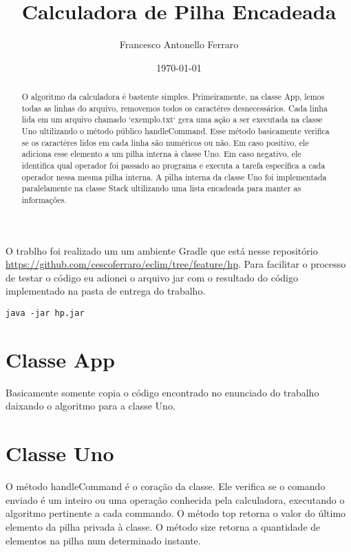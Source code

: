 \documentclass[11pt]{article}
\author{Francesco Antonello Ferraro}
\date{\today}
\title{Calculadora de Pilha Encadeada}
\begin{document}
\maketitle
\begin{abstract}

 O algoritmo da calculadora é bastente simples. Primeiramente, na classe App, lemos todas as linhas do arquivo, removemos todos os caractéres desnecessários. Cada linha lida em um arquivo chamado `exemplo.txt` gera uma ação a ser executada na classe Uno ultilizando o método público handleCommand. 
Esse método basicamente verifica se os caractéres lidos em cada linha são numéricos ou não. Em caso positivo, ele adiciona esse elemento a um pilha interna à classe Uno. Em caso negativo, ele identifica qual operador foi passado ao programa e executa a tarefa específica a cada operador nessa mesma pilha interna. A pilha interna da classe Uno foi implementada paralelamente na classe Stack ultilizando uma lista encadeada para manter as informações.

\end{abstract}




O trablho foi realizado um um ambiente Gradle que está nesse
repositório
\href{https://github.com/cescoferraro/eclim/tree/feature/hp}{https://github.com/cescoferraro/eclim/tree/feature/hp}. Para facilitar
o processo de testar o código eu adionei o arquivo jar com o resultado
do código implementado na pasta de entrega do trabalho.

\begin{verbatim}
java -jar hp.jar
\end{verbatim}

\section{Classe App}
\label{sec:org843c061}


Basicamente somente copia o código encontrado no enunciado do trabalho
daixando o algoritmo para a classe Uno.

\section{Classe Uno}
\label{sec:org6a7d657}

O método handleCommand é o coração da classe. Ele verifica se o
comando enviado é um inteiro ou uma operação conhecida pela
calculadora, executando o algoritmo pertinente a cada commando.
O método top retorna o valor do último elemento da pilha privada à
classe.  O método size retorna a quantidade de elementos na pilha
num determinado instante.
\end{document}
